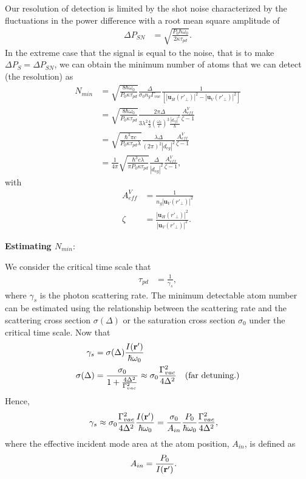 Our resolution of detection is limited by the shot noise characterized by the fluctuations in the power difference with a root mean square amplitude of 
\begin{align}
\Delta P_{SN} &= \sqrt{\frac{P_0 \hbar \omega_0 }{2\kappa \tau_{pd}}}. \label{eq:shotnoise}
\end{align}
In the extreme case that the signal is equal to the noise, that is to make $ \Delta P_S=\Delta P_{SN} $, we can obtain the minimum number of atoms that we can detect (the resolution) as
\begin{align}
N_{min} &= \sqrt{\frac{8  \hbar \omega_0  }{P_0\kappa \tau_{pd}}}\frac{\Delta}{\sigma_0 n_g\Gamma_{vac}}\frac{1}{\left[| \mathbf{u}_H(r'_{\!\perp})|^2- | \mathbf{u}_V(r'_{\!\perp})|^2 \right]}\\
&=\sqrt{\frac{8  \hbar \omega_0  }{P_0\kappa \tau_{pd}}}\frac{2\pi\Delta}{3\lambda^2 \frac{4}{3} \left( \frac{\omega_0}{c}\right)^3 \frac{|d_{eg}|^2}{\hbar}}\frac{A_{e\!f\!f}^V}{\zeta -1 }\\
&= \sqrt{\frac{\hbar^3 \pi c  }{P_0\kappa \tau_{pd}\lambda}}\frac{\lambda\Delta }{  \left( 2\pi\right)^2 |d_{eg}|^2}\frac{A_{e\!f\!f}^V}{\zeta -1 }\\
&= \frac{1}{4\pi}\sqrt{\frac{\hbar^3 c \lambda }{\pi P_0\kappa \tau_{pd}}}\frac{\Delta }{   |d_{eg}|^2}\frac{A_{e\!f\!f}^V}{\zeta -1 },
\end{align}
with
\begin{align}
A_{e\!f\!f}^V &= \frac{1}{n_g| \mathbf{u}_V(r'_{\!\perp})|^2}\\
\zeta &= \frac{| \mathbf{u}_H(r'_{\!\perp})|^2}{| \mathbf{u}_V(r'_{\!\perp})|^2}.
\end{align}

\textbf{Estimating $ N_{min} $}:

We consider the critical time scale that 
\begin{align}
\tau_{pd} &= \frac{1}{\gamma_s},
\end{align}
where $ \gamma_{s} $ is the photon scattering rate. The minimum detectable atom number can be estimated using the relationship between the scattering rate and the scattering cross section $ \sigma(\Delta) $ or the saturation cross section $ \sigma_0 $ under the critical time scale. Now that
\begin{align}
\gamma_s &= \sigma(\Delta) \frac{I(\mathbf{r}')}{\hbar \omega_0} \\
\sigma(\Delta) &=\frac{\sigma_0}{1+\frac{4\Delta^2}{\Gamma^2_{vac}}}\approx \sigma_0 \frac{\Gamma_{vac}^2}{4\Delta^2} \quad \text{(far detuning.)}
\end{align}
Hence,
\begin{align}
\gamma_s &\approx \sigma_0\frac{\Gamma_{vac}^2}{4\Delta^2} \frac{I(\mathbf{r}')}{\hbar \omega_0}=\frac{\sigma_0}{A_{in}}\frac{P_0}{\hbar\omega_0}\frac{\Gamma_{vac}^2}{4\Delta^2},
\end{align}
where the effective incident mode area at the atom position, $A_{in}  $, is defined as
\begin{align}
A_{in }&= \frac{P_0}{I(\mathbf{r}')}.
\end{align}

